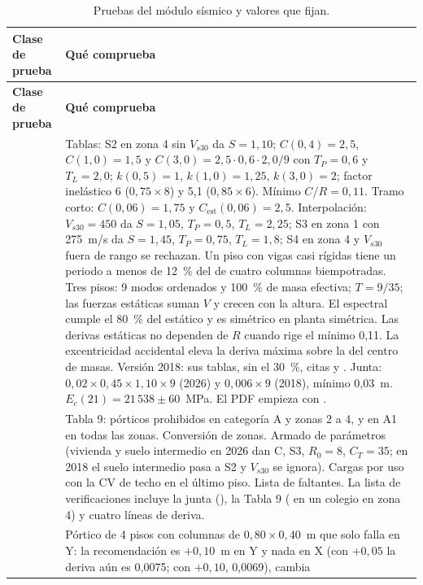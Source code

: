 \begin{longtable}{L{4.8cm}L{9.6cm}}
	\caption{Pruebas del módulo sísmico y valores que fijan.} \label{tab:sis-pruebas} \\
	\hline
	\textbf{Clase de prueba} & \textbf{Qué comprueba} \\ \hline
	\endfirsthead
	\hline
	\textbf{Clase de prueba} & \textbf{Qué comprueba} \\ \hline
	\endhead
	\hline
	\endfoot
	 & Tablas: S2 en zona 4 sin $V_{s30}$ da $S = 1{,}10$; $C(0{,}4) = 2{,}5$, $C(1{,}0) = 1{,}5$ y
	$C(3{,}0) = 2{,}5 \cdot 0{,}6 \cdot 2{,}0/9$ con $T_P = 0{,}6$ y $T_L = 2{,}0$; $k(0{,}5) = 1$, $k(1{,}0) = 1{,}25$,
	$k(3{,}0) = 2$; factor inelástico 6 ($0{,}75 \times 8$) y 5,1 ($0{,}85 \times 6$). Mínimo $C/R = 0{,}11$. Tramo corto:
	$C(0{,}06) = 1{,}75$ y $C_{\text{est}}(0{,}06) = 2{,}5$. Interpolación: $V_{s30} = 450$ da $S = 1{,}05$,
	$T_P = 0{,}5$, $T_L = 2{,}25$; S3 en zona 1 con 275~m/s da $S = 1{,}45$, $T_P = 0{,}75$, $T_L = 1{,}8$; S4 en zona 4
	y $V_{s30}$ fuera de rango se rechazan. Un piso con vigas casi rígidas tiene un periodo a menos de 12~\% del de cuatro
	columnas biempotradas. Tres pisos: 9 modos ordenados y 100~\% de masa efectiva; $T = 9/35$; las fuerzas estáticas
	suman $V$ y crecen con la altura. El espectral cumple el 80~\% del estático y es simétrico en planta simétrica. Las
	derivas estáticas no dependen de $R$ cuando rige el mínimo 0,11. La excentricidad accidental eleva la deriva máxima
	sobre la del centro de masas. Versión 2018: sus tablas, sin el 30~\%, citas  y . Junta:
	$0{,}02 \times 0{,}45 \times 1{,}10 \times 9$ (2026) y $0{,}006 \times 9$ (2018), mínimo 0,03~m. $E_c(21) = 21\,538
	\pm 60$~MPa. El PDF empieza con . \\
	 & Tabla 9: pórticos prohibidos en categoría A y zonas 2 a 4, y en A1 en todas las zonas.
	Conversión de zonas. Armado de parámetros (vivienda y suelo intermedio en 2026 dan C, S3, $R_0 = 8$, $C_T = 35$; en
	2018 el suelo intermedio pasa a S2 y $V_{s30}$ se ignora). Cargas por uso con la CV de techo en el último piso. Lista de
	faltantes. La lista de verificaciones incluye la junta (), la Tabla 9 ( en un colegio en zona 4)
	y cuatro líneas de deriva. \\
	 & Pórtico de 4 pisos con columnas de $0{,}80 \times 0{,}40$~m que solo falla en Y: la
	recomendación es $+0{,}10$~m en Y y nada en X (con $+0{,}05$ la deriva aún es 0,0075; con $+0{,}10$, 0,0069), cambia

\end{longtable}
